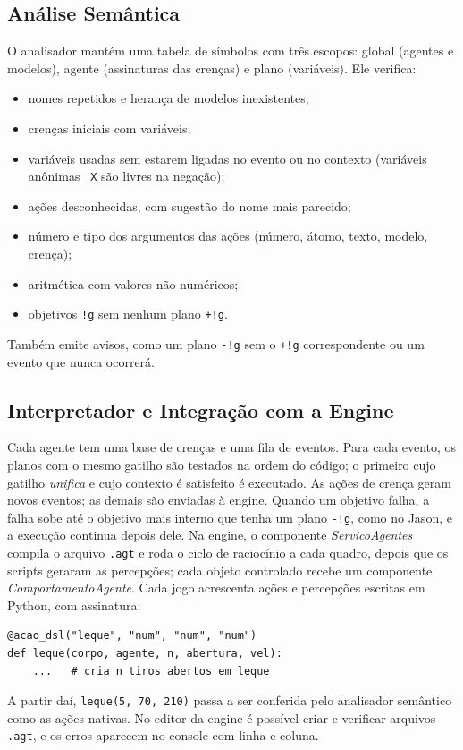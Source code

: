 \documentclass[conference]{IEEEtran}
\begin{document}
\subsection{Análise Semântica}
O analisador mantém uma tabela de símbolos com três escopos: global (agentes e modelos), agente (assinaturas das crenças) e plano (variáveis). Ele verifica:
\begin{itemize}
\item nomes repetidos e herança de modelos inexistentes;
\item crenças iniciais com variáveis;
\item variáveis usadas sem estarem ligadas no evento ou no contexto (variáveis anônimas \texttt{\_X} são livres na negação);
\item ações desconhecidas, com sugestão do nome mais parecido;
\item número e tipo dos argumentos das ações (número, átomo, texto, modelo, crença);
\item aritmética com valores não numéricos;
\item objetivos \texttt{!g} sem nenhum plano \texttt{+!g}.
\end{itemize}
Também emite avisos, como um plano \texttt{-!g} sem o \texttt{+!g} correspondente ou um evento que nunca ocorrerá.

\subsection{Interpretador e Integração com a Engine}
Cada agente tem uma base de crenças e uma fila de eventos. Para cada evento, os planos com o mesmo gatilho são testados na ordem do código; o primeiro cujo gatilho \textit{unifica} e cujo contexto é satisfeito é executado. As ações de crença geram novos eventos; as demais são enviadas à engine. Quando um objetivo falha, a falha sobe até o objetivo mais interno que tenha um plano \texttt{-!g}, como no Jason, e a execução continua depois dele.
Na engine, o componente \textit{ServicoAgentes} compila o arquivo \texttt{.agt} e roda o ciclo de raciocínio a cada quadro, depois que os scripts geraram as percepções; cada objeto controlado recebe um componente \textit{ComportamentoAgente}. Cada jogo acrescenta ações e percepções escritas em Python, com assinatura:
\begin{lstlisting}
@acao_dsl("leque", "num", "num", "num")
def leque(corpo, agente, n, abertura, vel):
    ...   # cria n tiros abertos em leque
\end{lstlisting}
A partir daí, \texttt{leque(5, 70, 210)} passa a ser conferida pelo analisador semântico como as ações nativas. No editor da engine é possível criar e verificar arquivos \texttt{.agt}, e os erros aparecem no console com linha e coluna.
\end{document}
